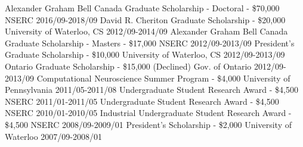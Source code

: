\begin{cvhonors}
  \cvhonor
    {Alexander Graham Bell Canada Graduate Scholarship - Doctoral - \$70,000}
    {NSERC}
    {2016/09-2018/09}
    {}
   \cvhonor
    {David R. Cheriton Graduate Scholarship - \$20,000}
    {University of Waterloo, CS}
    {2012/09-2014/09}
    {}
  \cvhonor
    {Alexander Graham Bell Canada Graduate Scholarship - Masters - \$17,000}
    {NSERC}
    {2012/09-2013/09}
    {}
  \cvhonor
    {President's Graduate Scholarship - \$10,000}
    {University of Waterloo, CS}
    {2012/09-2013/09}
    {}
   \cvhonor
    {Ontario Graduate Scholarship - \$15,000 (Declined)}
    {Gov. of Ontario}
    {2012/09-2013/09}
    {}
   \cvhonor
    {Computational Neuroscience Summer Program - \$4,000}
    {University of Pennsylvania}
    {2011/05-2011/08}
    {}
   \cvhonor
    {Undergraduate Student Research Award - \$4,500}
    {NSERC}
    {2011/01-2011/05}
    {}
   \cvhonor
    {Undergraduate Student Research Award - \$4,500}
    {NSERC}
    {2010/01-2010/05}
    {}
   \cvhonor
    {Industrial Undergraduate Student Research Award - \$4,500}
    {NSERC}
    {2008/09-2009/01}
    {}
   \cvhonor
    {President's Scholarship - \$2,000}
    {University of Waterloo}
    {2007/09-2008/01}
    {}
\end{cvhonors}

